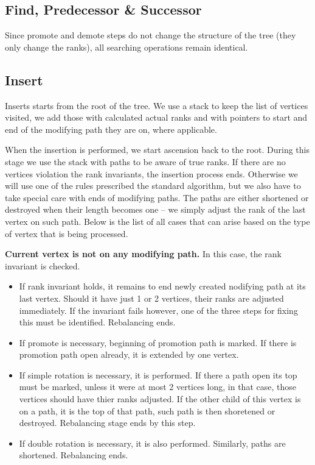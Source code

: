 \subsection{Find, Predecessor \& Successor}

Since promote and demote steps do not change the structure of the tree (they only change the ranks), all searching operations remain identical.

\subsection{Insert}

Inserts starts from the root of the tree. We use a stack to keep the list of vertices visited, we add those with calculated actual ranks and with pointers to start and end of the modifying path they are on, where applicable.

When the insertion is performed, we start ascension back to the root. During this stage we use the stack with paths to be aware of true ranks. If there are no vertices violation the rank invariants, the insertion process ends. Otherwise we will use one of the rules prescribed the standard algorithm, but we also have to take special care with ends of modifying paths. The paths are either shortened or destroyed when their length becomes one -- we simply adjust the rank of the last vertex on such path. Below is the list of all cases that can arise based on the type of vertex that is being processed.

\textbf{Current vertex is not on any modifying path.} In this case, the rank invariant is checked. 

\begin{itemize}

\item If rank invariant holds, it remains to end newly created nodifying path at its last vertex. Should it have just 1 or 2 vertices, their ranks are adjusted immediately. If the invariant fails however, one of the three steps for fixing this must be identified. Rebalancing ends.

\item If promote is necessary, beginning of promotion path is marked. If there is promotion path open already, it is extended by one vertex.

\item If simple rotation is necessary, it is performed. If there a path open its top must be marked, unless it were at most 2 vertices long, in that case, those vertices should have thier ranks adjusted. If the other child of this vertex is on a path, it is the top of that path, such path is then shoretened or destroyed. Rebalancing stage ends by this step.

\item If double rotation is necessary, it is also performed. Similarly, paths are shortened. Rebalancing ends.

\end{itemize}

